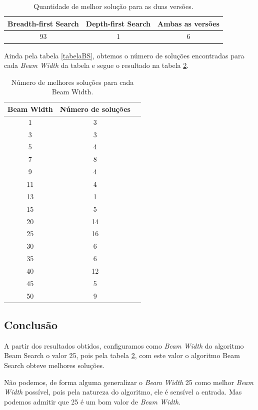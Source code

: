 \documentclass[a4paper,12pt]{article}
\begin{document}
\begin{table}[H]
\centering
\caption{Quantidade de melhor solução para as duas versões.} \label{QbestSolution}
\begin{tabular}{ccc}
\hline
Breadth-first Search & Depth-first Search & Ambas as versões \\
\hline
  93 & 1  &  6  \\
\hline
\end{tabular}
\end{table}


Ainda pela tabela \ref{tabelaBS}, obtemos o número de soluções encontradas para cada \emph{Beam Width} 
da tabela e segue o resultado na tabela \ref{NumBestSol}.


\begin{table}[H]
\centering
\caption{Número de melhores soluções para cada Beam Width.} \label{NumBestSol}
\begin{tabular}{ccc}
\hline
Beam Width & Número de soluções \\
\hline
1  &  3  \\
3  &  3  \\
5  &  4  \\
7  &  8  \\
9  &  4  \\
11  &  4  \\
13  &  1  \\
15  &  5  \\
20  &  14  \\
25  &  16  \\
30  &  6  \\
35  &  6  \\
40  &  12  \\
45  &  5  \\
50  &  9  \\
\hline
\end{tabular}
\end{table}


\subsection{Conclusão}

A partir dos resultados obtidos, configuramos como \emph{Beam Width} do algoritmo Beam Search o valor 25, pois 
pela tabela \ref{NumBestSol}, com este valor o algoritmo Beam Search obteve melhores soluções.

Não podemos, de forma alguma generalizar o \emph{Beam Width} 25 como melhor \emph{Beam Width} possível, pois pela 
natureza do algoritmo, ele é sensível a entrada. Mas podemos admitir que 25 é um bom valor de \emph{Beam Width}.
\end{document}
